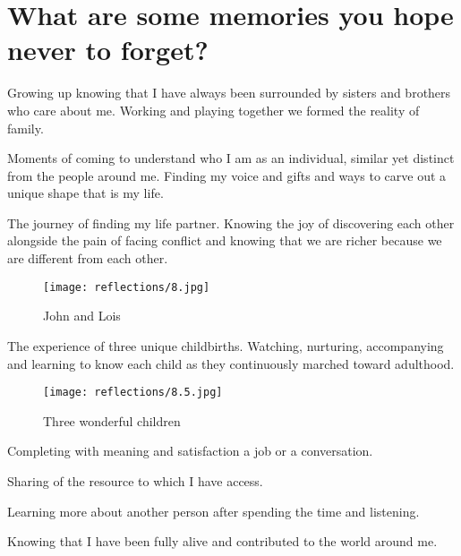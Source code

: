 \section{What are some memories you hope never to forget?}
Growing up knowing that I have always been surrounded by sisters and brothers who care about me.
Working and playing together we formed the reality of family.

Moments of coming to understand who I am as an individual, similar yet distinct from the people around me.
Finding my voice and gifts and ways to carve out a unique shape that is my life.

The journey of finding my life partner.
Knowing the joy of discovering each other alongside the pain of facing conflict and knowing that we are richer because we are different from each other.

\begin{figure}
\centering
\texttt{[image: reflections/8.jpg]}
\caption{
John and Lois
}
\end{figure}

The experience of three unique childbirths.
Watching, nurturing, accompanying and learning to know each child as they continuously marched toward adulthood.

\begin{figure}
\centering
\texttt{[image: reflections/8.5.jpg]}
\caption{
Three wonderful children
}
\end{figure}

Completing with meaning and satisfaction a job or a conversation.

Sharing of the resource to which I have access.

Learning more about another person after spending the time and listening.

Knowing that I have been fully alive and contributed to the world around me.






